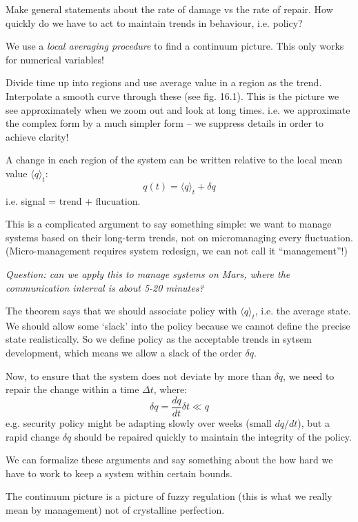 \documentclass{slides}
\begin{document}

Make general statements about the rate of damage vs the rate of repair.
How quickly do we have to act to maintain trends in behaviour, i.e. policy?

We use a {\em local averaging procedure} to find a continuum picture.
This only works for numerical variables!

Divide time up into regions and use average value in a region as the trend. 
Interpolate a smooth curve through these (see fig. 16.1). This is the picture
we see approximately when we zoom out and look at long times.
i.e. we approximate the complex form by a much simpler form --  we suppress
details in order to achieve clarity!

A change in each region of the system can be written relative to the local mean value
$\langle q\rangle_t$:
$$
q(t) = \langle q\rangle_t + \delta q
$$
i.e. signal = trend + flucuation.


This is a complicated argument to say something simple: we want to manage
systems based on their long-term trends, not on micromanaging every fluctuation.
(Micro-management requires system redesign, we can not call it ``management''!)

{\em Question: can we apply this to manage systems on Mars, where the communication interval is about 5-20 minutes?}

The theorem says that we should associate policy with $ \langle q\rangle_t$, i.e.
the average state. We should allow some `slack' into the policy because we cannot
define the precise state realistically. So we define policy as the acceptable
trends in sytsem development, which means we allow a slack of the order $\delta q$.

Now, to ensure that the system does not deviate by more than $\delta q$, we need to
repair the change within a time $\Delta t$, where:
$$
\delta q = \frac{dq}{dt}\delta t \ll q
$$
e.g. security policy might be adapting slowly over weeks (small $dq/dt$), but a
rapid change $\delta q$ should be repaired quickly to maintain the integrity
of the policy.

We can formalize these arguments and say something about the how hard we have to
work to keep a system within certain bounds.

The continuum picture is a picture of fuzzy regulation (this is what we really
mean by management) not of crystalline perfection.
\end{document}
